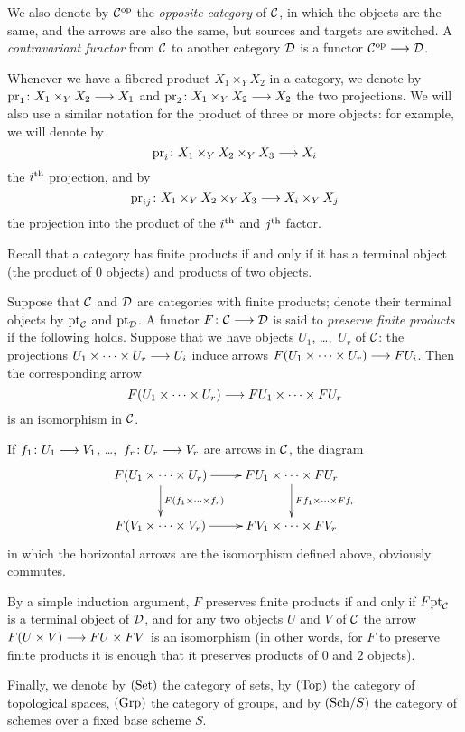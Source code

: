 \begin{1   PRELIMINARY NOTIONS}
\begin{1.2 Category theory}
We also denote by $\mathcal{C}^{\mathrm{op}}$ the \emph{opposite category}%
%
 of $\mathcal{C}$, in which the objects are the same, and the arrows are also the same, but sources and targets are switched. A \emph{contravariant functor}%
%
 from $\mathcal{C}$ to another category $\mathcal{D}$ is a functor $\cC\op \arr \cD$.

Whenever we have a fibered product $X_1 \times_Y X_2$ in a category, we denote by $\pr_1 \colon X_1 \times_Y X_2 \arr X_1$ and $\pr_2 \colon X_1 \times_Y X_2 \arr X_2$ the two projections. We will also use a similar notation for the product of three or more objects: for example, we will denote by
   \[
   \pr_{i} \colon X_1 \times_Y X_2 \times_{Y} X_{3} \arr X_i
   \]
the $i^\text{th}$ projection, and by
   \[
   \pr_{ij} \colon X_1 \times_Y X_2 \times_{Y} X_{3} \arr X_i \times_{Y} X_{j}
   \]
the projection into the product of the $i^\text{th}$ and  $j^\text{th}$ factor.

Recall that a category has finite products if and only if it has a terminal object (the product of $0$ objects) and products of two objects.

Suppose that $\mathcal{C}$ and $\mathcal{D}$ are categories with finite products; denote their terminal objects by $\mathrm{pt}_{\mathcal{C}}$ and $\mathrm{pt}_{\mathcal{D}}$. A functor $F \colon \cC \arr \cD$ is said to \emph{preserve finite products}%
 if the following holds. Suppose that we have objects $U_1$, \dots,~$U_r$ of $\mathcal{C}$: the projections $U_1 \times \dots \times U_r \arr U_i$ induce arrows $F(U_1 \times \dots \times U_r) \arr F U_i$. Then the corresponding arrow
   \[
   F(U_1 \times \dots \times U_r) \arr F U_1 \times \dots \times F U_r
   \]
is an isomorphism in $\mathcal{C}$.

If $f_1 \colon U_1 \arr V_1$, \dots,~$f_r \colon U_r \arr V_r$ are arrows in $\mathcal{C}$, the diagram
   \[
   \xymatrix{
   F(U_1 \times \dots \times U_r) \ar[r]
           \ar[d]^{F(f_1\times \dots \times f_r)} &
   F U_1 \times \dots \times F U_r \ar[d]^{Ff_1 \times \dots \times Ff_r} \\
   F(V_1 \times \dots \times V_r) \ar[r] &
   F V_1 \times \dots \times F V_r
   }
   \]
in which the horizontal arrows are the isomorphism defined above, obviously commutes.

By a simple induction argument, $F$ preserves finite products if and only if $F\mathrm{pt}_{\mathcal{C}}$ is a terminal object of $\mathcal{D}$, and for any two objects $U$ and $V$ of $\mathcal{C}$ the arrow $F(U \times V) \arr FU \times FV$ is an isomorphism (in other words, for $F$ to preserve finite products it is enough that it preserves products of $0$ and $2$ objects).



Finally, we denote by $(\mathrm{Set})$ the category of sets, by $(\mathrm{Top})$ the category of topological spaces, $(\mathrm{Grp})$ the category of groups, and by $({\mathrm{Sch}/S})$ the category of schemes over a fixed base scheme $S$.


\end{1.2 Category theory}
\end{1   PRELIMINARY NOTIONS}
